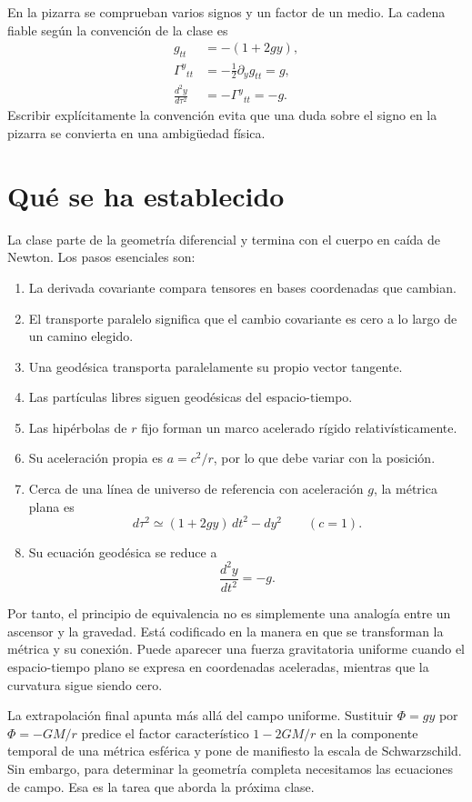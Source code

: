 En la pizarra se comprueban varios signos y un factor de un medio. La cadena fiable según la convención de la clase es
\begin{equation}
\begin{aligned}
g_{tt}&=-(1+2gy),\\
\Gamma^y{}_{tt}&=-\frac12\partial_yg_{tt}=g,\\
\frac{d^2y}{d\tau^2}&=-\Gamma^y{}_{tt}=-g.
\end{aligned}
\end{equation}
Escribir explícitamente la convención evita que una duda sobre el signo en la pizarra se convierta en una ambigüedad física.

\section{Qué se ha establecido}

La clase parte de la geometría diferencial y termina con el cuerpo en caída de Newton. Los pasos esenciales son:
\begin{enumerate}
\item La derivada covariante compara tensores en bases coordenadas que cambian.
\item El transporte paralelo significa que el cambio covariante es cero a lo largo de un camino elegido.
\item Una geodésica transporta paralelamente su propio vector tangente.
\item Las partículas libres siguen geodésicas del espacio-tiempo.
\item Las hipérbolas de \(r\) fijo forman un marco acelerado rígido relativísticamente.
\item Su aceleración propia es \(a=c^2/r\), por lo que debe variar con la posición.
\item Cerca de una línea de universo de referencia con aceleración \(g\), la métrica plana es
\begin{equation}
d\tau^2\simeq(1+2gy)\,dt^2-dy^2
\qquad(c=1).
\end{equation}
\item Su ecuación geodésica se reduce a
\begin{equation}
\frac{d^2y}{dt^2}=-g.
\end{equation}
\end{enumerate}

Por tanto, el principio de equivalencia no es simplemente una analogía entre un ascensor y la gravedad. Está codificado en la manera en que se transforman la métrica y su conexión. Puede aparecer una fuerza gravitatoria uniforme cuando el espacio-tiempo plano se expresa en coordenadas aceleradas, mientras que la curvatura sigue siendo cero.

La extrapolación final apunta más allá del campo uniforme. Sustituir \(\Phi=gy\) por \(\Phi=-GM/r\) predice el factor característico \(1-2GM/r\) en la componente temporal de una métrica esférica y pone de manifiesto la escala de Schwarzschild. Sin embargo, para determinar la geometría completa necesitamos las ecuaciones de campo. Esa es la tarea que aborda la próxima clase.
